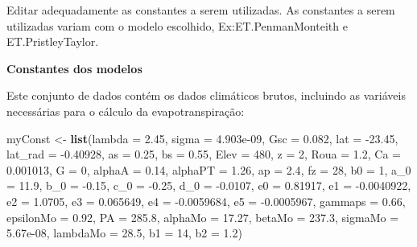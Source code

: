 \documentclass[
]{book}
\newenvironment{Shaded}{\begin{snugshade}}{\end{snugshade}}
\newcommand{\DataTypeTok}[1]{\textcolor[rgb]{0.13,0.29,0.53}{#1}}
\newcommand{\DecValTok}[1]{\textcolor[rgb]{0.00,0.00,0.81}{#1}}
\newcommand{\FloatTok}[1]{\textcolor[rgb]{0.00,0.00,0.81}{#1}}
\newcommand{\KeywordTok}[1]{\textcolor[rgb]{0.13,0.29,0.53}{\textbf{#1}}}
\newcommand{\NormalTok}[1]{#1}
\newcommand{\StringTok}[1]{\textcolor[rgb]{0.31,0.60,0.02}{#1}}
\begin{document}
Editar adequadamente as constantes a serem utilizadas. As constantes a serem utilizadas variam com o modelo escolhido, Ex:ET.PenmanMonteith e ET.PristleyTaylor.

\textbf{Constantes dos modelos}

Este conjunto de dados contém os dados climáticos brutos, incluindo as variáveis necessárias para o cálculo da evapotranspiração:

\begin{Shaded}
\begin{Highlighting}[]
\NormalTok{myConst <-}\StringTok{ }\KeywordTok{list}\NormalTok{(}\DataTypeTok{lambda =} \FloatTok{2.45}\NormalTok{, }\DataTypeTok{sigma =} \FloatTok{4.903e-09}\NormalTok{, }\DataTypeTok{Gsc =} \FloatTok{0.082}\NormalTok{, }
                \DataTypeTok{lat =} \FloatTok{-23.45}\NormalTok{, }\DataTypeTok{lat_rad =} \FloatTok{-0.40928}\NormalTok{, }\DataTypeTok{as =} \FloatTok{0.25}\NormalTok{, }
                \DataTypeTok{bs =} \FloatTok{0.55}\NormalTok{, }\DataTypeTok{Elev =} \DecValTok{480}\NormalTok{, }\DataTypeTok{z =} \DecValTok{2}\NormalTok{, }\DataTypeTok{Roua =} \FloatTok{1.2}\NormalTok{, }
                \DataTypeTok{Ca =} \FloatTok{0.001013}\NormalTok{, }\DataTypeTok{G =} \DecValTok{0}\NormalTok{, }
                \DataTypeTok{alphaA =} \FloatTok{0.14}\NormalTok{, }\DataTypeTok{alphaPT =} \FloatTok{1.26}\NormalTok{, }
                \DataTypeTok{ap =} \FloatTok{2.4}\NormalTok{, }\DataTypeTok{fz =} \DecValTok{28}\NormalTok{, }\DataTypeTok{b0 =} \DecValTok{1}\NormalTok{, }
                \DataTypeTok{a_0 =} \FloatTok{11.9}\NormalTok{, }\DataTypeTok{b_0 =} \FloatTok{-0.15}\NormalTok{, }
                \DataTypeTok{c_0 =} \FloatTok{-0.25}\NormalTok{, }\DataTypeTok{d_0 =} \FloatTok{-0.0107}\NormalTok{, }
                \DataTypeTok{e0 =} \FloatTok{0.81917}\NormalTok{,  }
                \DataTypeTok{e1 =} \FloatTok{-0.0040922}\NormalTok{, }\DataTypeTok{e2 =} \FloatTok{1.0705}\NormalTok{, }\DataTypeTok{e3 =} \FloatTok{0.065649}\NormalTok{, }
                \DataTypeTok{e4 =} \FloatTok{-0.0059684}\NormalTok{, }
                \DataTypeTok{e5 =} \FloatTok{-0.0005967}\NormalTok{, }\DataTypeTok{gammaps =} \FloatTok{0.66}\NormalTok{, }
                \DataTypeTok{epsilonMo =} \FloatTok{0.92}\NormalTok{, }\DataTypeTok{PA =} \FloatTok{285.8}\NormalTok{, }
                \DataTypeTok{alphaMo =} \FloatTok{17.27}\NormalTok{, }\DataTypeTok{betaMo =} \FloatTok{237.3}\NormalTok{, }
                \DataTypeTok{sigmaMo =} \FloatTok{5.67e-08}\NormalTok{, }\DataTypeTok{lambdaMo =} \FloatTok{28.5}\NormalTok{, }
                \DataTypeTok{b1 =} \DecValTok{14}\NormalTok{, }\DataTypeTok{b2 =} \FloatTok{1.2}\NormalTok{)}
\end{Highlighting}
\end{Shaded}
\end{document}
